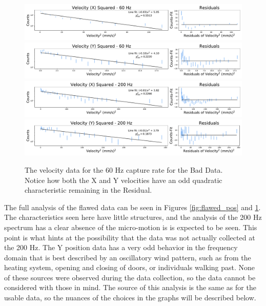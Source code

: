 \documentclass[12pt]{article}
\begin{document}
\begin{figure}[!ht]
\centering
    \includegraphics[width=\textwidth]{data_33_x_vel.pdf}
    \includegraphics[width=\textwidth]{data_33_y_vel.pdf}
    \includegraphics[width=\textwidth]{data_36_x_vel.pdf}
    \includegraphics[width=\textwidth]{data_36_y_vel.pdf}
	\caption{The velocity data for the 60 Hz capture rate for the Bad Data. Notice how both the X and Y velocities have an odd quadratic characteristic remaining in the Residual.}
    \label{fig:flawed_vel}
\end{figure}

The full analysis of the flawed data can be seen in Figures \ref{fig:flawed_pos} and \ref{fig:flawed_vel}. The characteristics seen here have little structures, and the analysis of the 200 Hz spectrum has a clear absence of the micro-motion is is expected to be seen. This point is what hints at the possibility that the data was not actually collected at the 200 Hz. The Y position data has a very odd behavior in the frequency domain that is best described by an oscillatory wind pattern, such as from the heating system, opening and closing of doors, or individuals walking past. None of these sources were observed during the data collection, so the data cannot be considered with those in mind. The source of this analysis is the same as for the usable data, so the nuances of the choices in the graphs will be described below.
\end{document}
